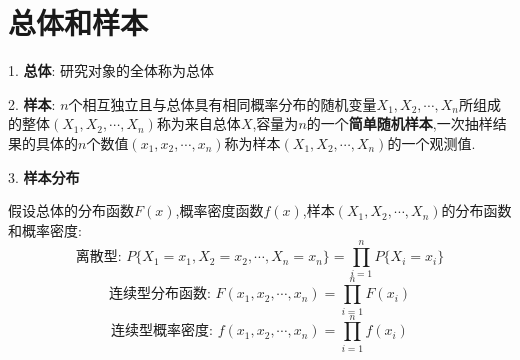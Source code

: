 \section{总体和样本}
\begin{definition}[统计概念和统计量]
	1. \textbf{总体}: 研究对象的全体称为总体
	
	2. \textbf{样本}: $n$个相互独立且与总体具有相同概率分布的随机变量$X_{1},X_{2},\cdots,X_{n}$所组成的整体$(X_{1},X_{2},\cdots,X_{n})$称为来自总体$X$,容量为$n$的一个\textbf{简单随机样本},一次抽样结果的具体的$n$个数值$(x_{1},x_{2},\cdots,x_{n})$称为样本$(X_{1},X_{2},\cdots,X_{n})$的一个观测值.
	
	3. \textbf{样本分布}
	
	假设总体的分布函数$F(x)$,概率密度函数$f(x)$,样本$(X_{1},X_{2},\cdots,X_{n})$的分布函数和概率密度: 
	$$\text{离散型: }P\{X_{1}=x_{1},X_{2}=x_{2},\cdots,X_{n}=x_{n}\}=\prod\limits_{i=1}^{n}P\{X_{i}=x_{i}\}$$
	$$\text{连续型分布函数: }F(x_{1},x_{2},\cdots,x_{n})=\prod\limits_{i=1}^{n}F(x_{i})$$
	$$\text{连续型概率密度: }f(x_{1},x_{2},\cdots,x_{n})=\prod\limits_{i=1}^{n}f(x_{i})$$
\end{definition}
